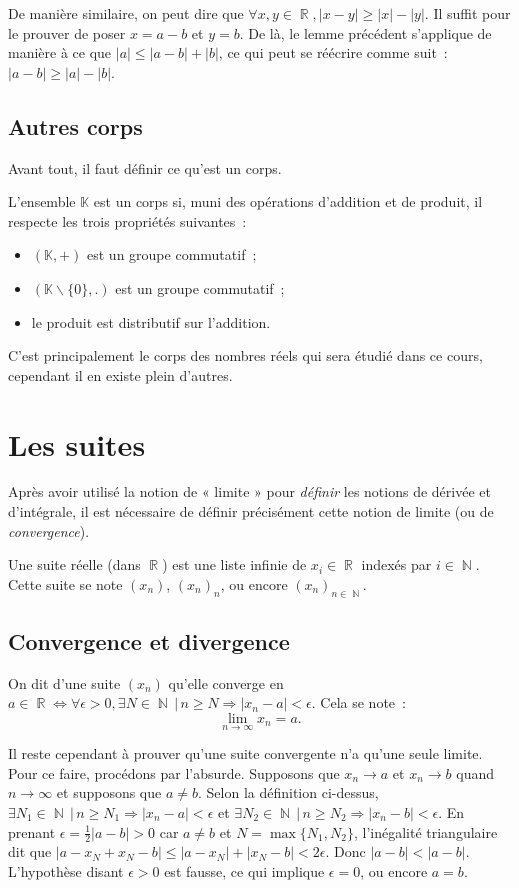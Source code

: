 \documentclass{article}
\DeclareMathOperator{\R}{\mathbb R}
\DeclareMathOperator{\N}{\mathbb N}
\theoremstyle{definition}
\theoremstyle{remark}
\begin{document}
		De manière similaire, on peut dire que $\forall x, y \in \R, |x - y| \geq |x| - |y|$. Il suffit pour le prouver de poser $x = a - b$ et $y = b$.
		De là, le lemme précédent s'applique de manière à ce que $|a| \leq |a - b| + |b|$, ce qui peut se réécrire comme suit~: $|a - b| \geq |a| - |b|$.

	\subsection{Autres corps}
		Avant tout, il faut définir ce qu'est un corps.

		L'ensemble $\mathbb K$ est un corps si, muni des opérations d'addition et de produit, il respecte les trois propriétés suivantes~:
		\begin{itemize}
			\item $(\mathbb K, +)$ est un groupe commutatif~;
			\item $(\mathbb K \backslash \{0\}, .)$ est un groupe commutatif~;
			\item le produit est distributif sur l'addition.
		\end{itemize}

		C'est principalement le corps des nombres réels qui sera étudié dans ce cours, cependant il en existe plein d'autres.

\newpage
\section{Les suites}
	Après avoir utilisé la notion de « limite » pour \textit{définir} les notions de dérivée et d'intégrale, il est nécessaire de définir précisément
	cette notion de limite (ou de \textit{convergence}).

	Une suite réelle (dans $\R$) est une liste infinie de $x_i \in \R$ indexés par $i \in \N$. Cette suite se note $(x_n)$, $(x_n)_n$, ou
	encore $(x_n)_{n \in \N}$.

	\subsection{Convergence et divergence}
		On dit d'une suite $(x_n)$ qu'elle converge en $a \in \R \iff \forall \epsilon > 0, \exists N \in \N \, | \, n \geq N \Rightarrow |x_n - a| < \epsilon$.
		Cela se note~:
		\[\lim_{n \to \infty}x_n = a.\]

		Il reste cependant à prouver qu'une suite convergente n'a qu'une seule limite. Pour ce faire, procédons par l'absurde. Supposons que
		$x_n \to a$ et $x_n \to b$ quand $n \to \infty$ et supposons que $a \neq b$. Selon la définition ci-dessus,
		$\exists N_1 \in \N \, | \, n \geq N_1 \Rightarrow |x_n - a| < \epsilon$ et
		$\exists N_2 \in \N \, | \, n \geq N_2 \Rightarrow |x_n - b| < \epsilon$. En prenant $\epsilon = \frac 12|a - b| > 0$ car $a \neq b$
		et $N = \max\{N_1, N_2\}$, l'inégalité triangulaire dit que $|a - x_N + x_N - b| \leq |a - x_N| + |x_N - b| < 2\epsilon$. Donc $|a - b| < |a - b|$.
		L'hypothèse disant $\epsilon > 0$ est fausse, ce qui implique $\epsilon = 0$, ou encore $a = b$.
\end{document}
